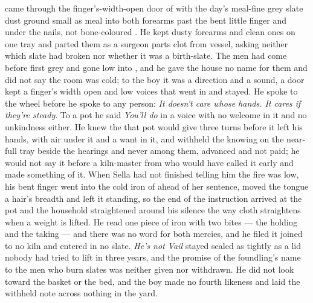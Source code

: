  came through the finger's-width-open door of  with the day's meal-fine grey slate dust ground small as meal into both forearms past the bent little finger and under the nails, not bone-coloured . He kept dusty forearms and clean ones on one tray and parted them as a surgeon parts clot from vessel, asking neither which slate had broken nor whether it was a birth-slate. The men had come before first grey and gone low into , and he gave the house no name for them and did not say the room was cold; to the boy it was a direction and a sound, a door kept a finger's width open and low voices that went in and stayed. He spoke to the wheel before he spoke to any person: \emph{It doesn't care whose hands. It cares if they're steady}. To a pot he said \emph{You'll do} in a voice with no welcome in it and no unkindness either. He knew the  that pot would give three turns before it left his hands, with air under it and a want in it, and withheld the knowing on the near-full tray beside the hearings and never among them, advanced and not paid; he would not say it before a kiln-master from  who would have called it early and made something of it. When Sella had not finished telling him the fire was low, his bent finger went into the cold iron of  ahead of her sentence, moved the tongue a hair's breadth and left it standing, so the end of the instruction arrived at the pot and the household straightened around his silence the way cloth straightens when a weight is lifted. He read one piece of iron with two bites --- the holding and the taking --- and there was no  word for both mercies, and he filed it joined to no kiln and entered in no slate. \emph{He's not Vail} stayed sealed as tightly as a lid nobody had tried to lift in three years, and the promise of the foundling's name to the men who burn slates was neither given nor withdrawn. He did not look toward the basket or the bed, and the boy made no fourth likeness and laid the withheld note across nothing in the yard.

\scenebreak

